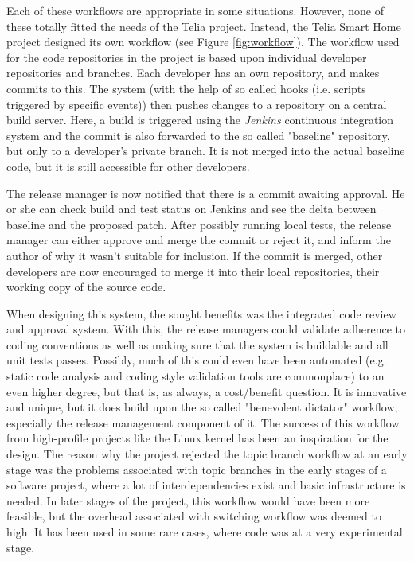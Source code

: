 \documentclass{llncs}
\begin{document}
Each of these workflows are appropriate in some situations. However,
none of these totally fitted the needs of the Telia project. Instead,
the Telia Smart Home project designed its own workflow (see Figure
\ref{fig:workflow}). The workflow used for the code repositories in the
project is based upon individual developer repositories and branches.
Each developer has an own repository, and makes commits to this. The
system (with the help of so called hooks (i.e. scripts triggered by
specific events)) then pushes changes to a repository on a central build
server. Here, a build is triggered using the \emph{Jenkins} continuous
integration system and the commit is also forwarded to the so called
"baseline" repository, but only to a developer's private branch. It is
not merged into the actual baseline code, but it is still accessible for
other developers.

The release manager is now notified that there is a commit awaiting
approval. He or she can check build and test status on Jenkins and see the
delta between baseline and the proposed patch. After possibly running local
tests, the release manager can either approve and merge the commit or
reject it, and inform the author of why it wasn't suitable for inclusion.
If the commit is merged, other developers are now encouraged to merge it 
into their local repositories, their working copy of the source code. 

When designing this system, the sought benefits was the integrated code 
review and approval system. With this, the release managers could validate 
adherence to coding conventions as well as making sure that the system
is buildable and all unit tests passes. Possibly, much of this could even
have been automated (e.g. static code analysis and coding style validation
tools are commonplace) to an even higher degree, but that is, as always, a 
cost/benefit question. It is innovative and unique, but it does build upon
the so called "benevolent dictator" workflow, especially the release
management component of it. The success of this workflow from high-profile 
projects like the Linux kernel has been an inspiration for the design.
The reason why the project rejected the topic branch workflow at an early
stage was the problems associated with topic branches in the early stages
of a software project, where a lot of interdependencies exist and basic
infrastructure is needed. In later stages of the project, this workflow
would have been more feasible, but the overhead associated with switching
workflow was deemed to high. It has been used in some rare cases, where code
was at a very experimental stage.
\end{document}
